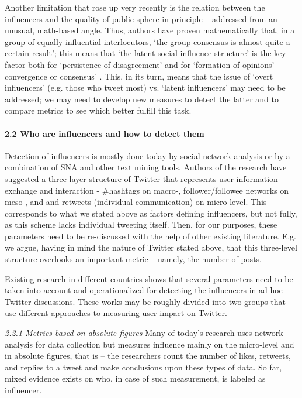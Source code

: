 Another limitation that rose up very recently is the relation between the influencers and the quality of public sphere in principle -- addressed from an unusual, math-based angle. Thus, authors \cite{LiTang} have proven mathematically that, in a group of equally influential interlocutors, ‘the group consensus is almost quite a certain result’; this means that ‘the latent social influence structure’ is the key factor both for ‘persistence of disagreement’ and for ‘formation of opinions’ convergence or consensus’ \cite[p.~74]{LiTang}. This, in its turn, means that the issue of ‘overt influencers’ (e.g. those who tweet most) vs. ‘latent influencers’ may need to be addressed; we may need to develop new measures to detect the latter and to compare metrics to see which better fulfill this task.

\paragraph{2.2 Who are influencers and how to detect them}
Detection of influencers is mostly done today by social network analysis or by a combination of SNA and other text mining tools. Authors of the research \cite{BrunsMoe} have suggested a three-layer structure of Twitter that represents user information exchange and interaction - \#hashtags on macro-, follower/followee networks on meso-, and \@replies and retweets (individual communication) on micro-level. This corresponds to what we stated above as factors defining influencers, but not fully, as this scheme lacks individual tweeting itself. Then, for our purposes, these parameters need to be re-discussed with the help of other existing literature. E.g. we argue, having in mind the nature of Twitter stated above, that this three-level structure overlooks an important metric -- namely, the number of posts.

Existing research in different countries shows that several parameters need to be taken into account and operationalized for detecting the influencers in ad hoc Twitter discussions. These works may be roughly divided into two groups that use different approaches to measuring user impact on Twitter.

\textit{2.2.1 Metrics based on absolute figures}
Many of today’s research uses network analysis for data collection but measures influence mainly on the micro-level and in absolute figures, that is -- the researchers count the number of likes, retweets, and replies to a tweet and make conclusions upon these types of data. So far, mixed evidence exists on who, in case of such measurement, is labeled as influencer.

